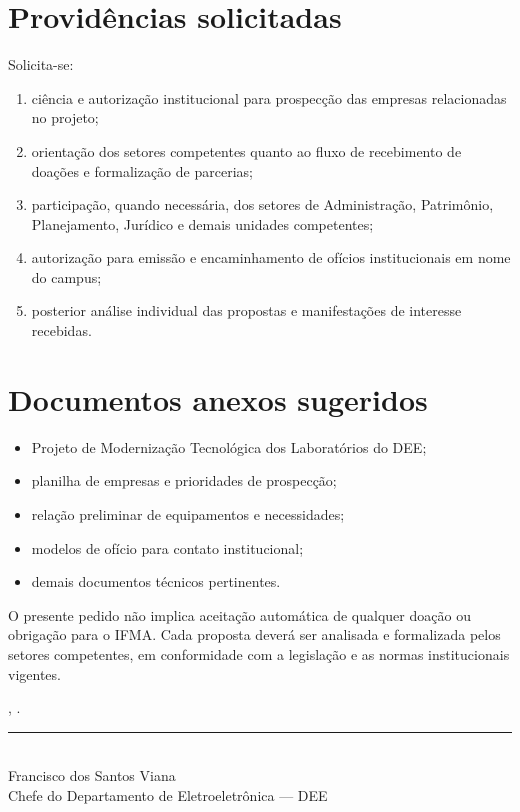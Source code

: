 \documentclass[12pt,a4paper]{article}
\begin{document}
\section{Providências solicitadas}
Solicita-se:
\begin{enumerate}[leftmargin=*]
\item ciência e autorização institucional para prospecção das empresas relacionadas no projeto;
\item orientação dos setores competentes quanto ao fluxo de recebimento de doações e formalização de parcerias;
\item participação, quando necessária, dos setores de Administração, Patrimônio, Planejamento, Jurídico e demais unidades competentes;
\item autorização para emissão e encaminhamento de ofícios institucionais em nome do campus;
\item posterior análise individual das propostas e manifestações de interesse recebidas.
\end{enumerate}

\section{Documentos anexos sugeridos}
\begin{itemize}[leftmargin=*]
\item Projeto de Modernização Tecnológica dos Laboratórios do DEE;
\item planilha de empresas e prioridades de prospecção;
\item relação preliminar de equipamentos e necessidades;
\item modelos de ofício para contato institucional;
\item demais documentos técnicos pertinentes.
\end{itemize}

\begin{destaque}
O presente pedido não implica aceitação automática de qualquer doação ou obrigação para o IFMA. Cada proposta deverá ser analisada e formalizada pelos setores competentes, em conformidade com a legislação e as normas institucionais vigentes.
\end{destaque}

\vfill
\begin{center}
\cidade, .\\[15mm]
\rule{8cm}{0.4pt}\\
Francisco dos Santos Viana\\
Chefe do Departamento de Eletroeletrônica — DEE
\end{center}
\end{document}
